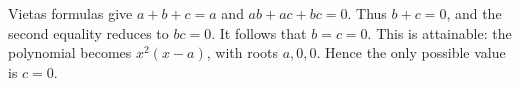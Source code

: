 Vieta\textquotesingle s formulas give $a+b+c=a$ and $ab+ac+bc=0$. Thus $b+c=0$, and the second equality reduces to $bc=0$. It follows that $b=c=0$. This is attainable: the polynomial becomes $x^2(x-a)$, with roots $a,0,0$. Hence the only possible value is $\boxed{c=0}$.

